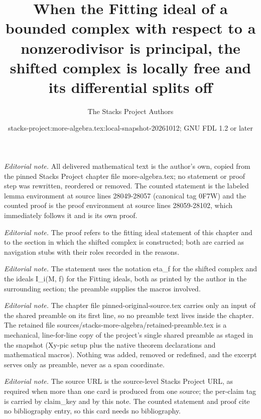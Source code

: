 \documentclass[10pt,a4paper]{amsart}
\title{When the Fitting ideal of a bounded complex with respect to a nonzerodivisor is principal, the shifted complex is locally free and its differential splits off}
\author{The Stacks Project Authors}
\date{stacks-project:more-algebra.tex:local-snapshot-20261012; GNU FDL 1.2 or later}
\theoremstyle{plain}
\theoremstyle{definition}
\theoremstyle{remark}
\numberwithin{equation}{subsection}
\begin{document}
\maketitle
\setcounter{subsection}{1}
\noindent\textit{Editorial note.} All delivered mathematical text is the author's own, copied from the pinned Stacks Project chapter file more-algebra.tex; no statement or proof step was rewritten, reordered or removed. The counted statement is the labeled lemma environment at source lines 28049-28057 (canonical tag 0F7W) and the counted proof is the proof environment at source lines 28059-28102, which immediately follows it and is its own proof.\par\medskip
\noindent\textit{Editorial note.} The proof refers to the fitting ideal statement of this chapter and to the section in which the shifted complex is constructed; both are carried as navigation stubs with their roles recorded in the reasons.\par\medskip
\noindent\textit{Editorial note.} The statement uses the notation eta\_f for the shifted complex and the ideals I\_i(M, f) for the Fitting ideals, both as printed by the author in the surrounding section; the preamble supplies the macros involved.\par\medskip
\noindent\textit{Editorial note.} The chapter file pinned-original-source.tex carries only an input of the shared preamble on its first line, so no preamble text lives inside the chapter. The retained file sources/stacks-more-algebra/retained-preamble.tex is a mechanical, line-for-line copy of the project's single shared preamble as staged in the snapshot (Xy-pic setup plus the native theorem declarations and mathematical macros). Nothing was added, removed or redefined, and the excerpt serves only as preamble, never as a span coordinate.\par\medskip
\noindent\textit{Editorial note.} The source URL is the source-level Stacks Project URL, as required when more than one card is produced from one source; the per-claim tag is carried by claim\_key and by this note. The counted statement and proof cite no bibliography entry, so this card needs no bibliography.\par\medskip
\end{document}
